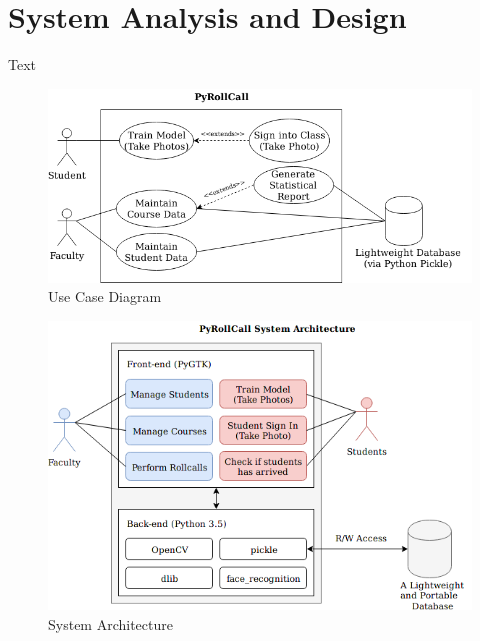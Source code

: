 \section{System Analysis and Design}
Text

\begin{figure}[!htb]
  \centering
  \includegraphics[width=\linewidth]{figures/use-case.png}
  \caption{Use Case Diagram}
  \label{fig:implementation}
\end{figure}

\begin{figure}[!htb]
  \centering
  \includegraphics[width=\linewidth]{figures/system-architecture.png}
  \caption{System Architecture}
  \label{fig:implementation}
\end{figure}
